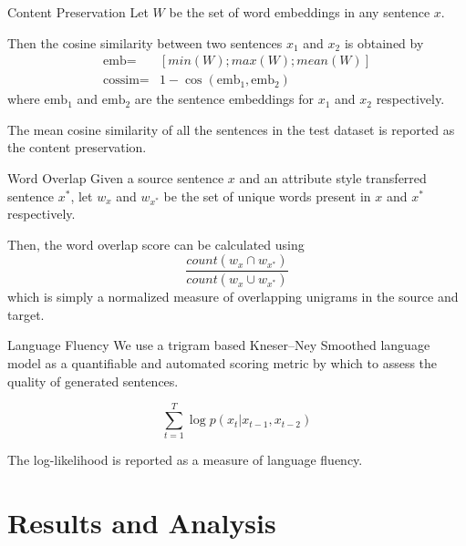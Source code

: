 \documentclass[aspectratio=169]{beamer}
\begin{document}
\begin{frame}{Content Preservation}
	Let $W$ be the set of word embeddings \citep{pennington2014glove} in any sentence $x$.

	Then the cosine similarity between two sentences $x_1$ and $x_2$ is obtained by
	\begin{align*}
		\text{emb} =    & [min(W);max(W);mean(W)]              \\
		\text{cossim} = & 1 - \cos(\text{emb}_1, \text{emb}_2)
	\end{align*}
	where $\text{emb}_1$ and $\text{emb}_2$ are the sentence embeddings for $x_1$ and $x_2$ respectively.

	The mean cosine similarity of all the sentences in the test dataset is reported as the content preservation.
\end{frame}

\begin{frame}{Word Overlap}
	Given a source sentence $x$ and an attribute style transferred sentence $x^*$, let $w_x$ and $w_{x^*}$ be the set of unique words present in $x$ and $x^*$ respectively.

	Then, the word overlap score can be calculated using
	\begin{equation*}
		\frac{count(w_x \cap w_{x^*})}{count(w_x \cup w_{x^*})}
	\end{equation*}
	which is simply a normalized measure of overlapping unigrams in the source and target.
\end{frame}

\begin{frame}{Language Fluency}
	We use a trigram based Kneser–Ney Smoothed language model \citep{kneser1995improved} as a quantifiable and automated scoring metric by which to assess the quality of generated sentences.

	\begin{equation*}
		\sum_{t=1}^T \log p(x_t | x_{t-1}, x_{t-2})
	\end{equation*}

	The log-likelihood is reported as a measure of language fluency.
\end{frame}


% 

\section{Results and Analysis}
\end{document}
